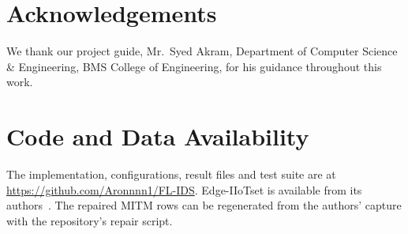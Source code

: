 \section*{Acknowledgements}
We thank our project guide, Mr.\ Syed Akram, Department of Computer Science \& Engineering, BMS College of Engineering, for his guidance throughout this work.

\section*{Code and Data Availability}
The implementation, configurations, result files and test suite are at \url{https://github.com/Aronnnn1/FL-IDS}. Edge-IIoTset is available from its authors~\cite{ferrag2022}. The repaired MITM rows can be regenerated from the authors' capture with the repository's repair script.
